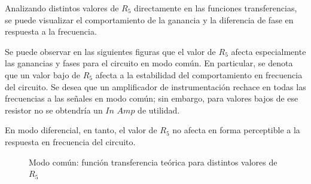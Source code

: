 Analizando distintos valores de $R_{5}$ directamente en las funciones transferencias, se puede visualizar el comportamiento de la ganancia y la diferencia de fase en respuesta a la frecuencia. 

Se puede observar en las siguientes figuras que el valor de $R_{5}$ afecta especialmente las ganancias y fases para el circuito en modo común. En particular, 
se denota que un valor bajo de $R_{5}$ afecta a la estabilidad del comportamiento en frecuencia del circuito. Se desea que un amplificador de instrumentación rechace en todas las frecuencias a las señales 
en modo común; sin embargo, para valores bajos de ese resistor no se obtendría un $In$ $Amp$ de utilidad. 

En modo diferencial, en tanto, el valor de $R_{5}$ no afecta en forma perceptible a la respuesta en frecuencia del circuito. 

\begin{figure}[H]
    \centering
    \hfill
    \caption{Modo común: función transferencia teórica para distintos valores de $R_{5}$}
    \label{fig:R5MC}
  \end{figure}
  
